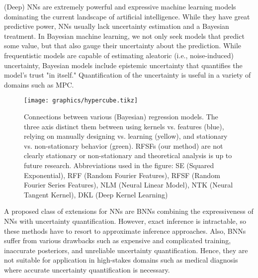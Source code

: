 (Deep) \acp{NN} are extremely powerful and expressive machine learning models dominating the current landscape of artificial intelligence\cite{krizhevskyImageNetClassificationDeep2012}.
While they have great predictive power, \acp{NN} usually lack uncertainty estimation and a Bayesian treatment.
In Bayesian machine learning, we not only seek models that predict some value, but that also gauge their uncertainty about the prediction.
While frequentistic models are capable of estimating aleatoric (i.e., noise-induced) uncertainty, Bayesian models include epistemic uncertainty that quantifies the model's trust "in itself."
Quantification of the uncertainty is useful in a variety of domains such as \ac{MPC}\cite{hewingLearningBasedModelPredictive2020,bradfordStochasticDatadrivenModel2020}.

\begin{figure}
	\centering
	\texttt{[image: graphics/hypercube.tikz]}
	\caption{
		Connections between various (Bayesian) regression models.
		The three axis distinct them between using kernels vs. features (blue), relying on manually designing vs. learning (yellow), and stationary vs. non-stationary behavior (green).
		\acsp{RFSF} (our method) are not clearly stationary or non-stationary and theoretical analysis is up to future research.
		Abbreviations used in the figure: \acs{SE} (Squared Exponential), \acs{RFF} (Random Fourier Features), \acs{RFSF} (Random Fourier Series Features), \acs{NLM} (Neural Linear Model), \acs{NTK} (Neural Tangent Kernel), \acs{DKL} (Deep Kernel Learning)
	}
	\label{fig:hypercube}
\end{figure}

A proposed class of extensions for \acp{NN} are \acp{BNN}\cite{mackayPracticalBayesianFramework1992,nealBayesianLearningNeural2012} combining the expressiveness of \acp{NN} with uncertainty quantification.
However, exact inference is intractable, so these methods have to resort to approximate inference approaches\cite{nealBayesianLearningNeural2012,hernandez-lobatoProbabilisticBackpropagationScalable2015,denkerTransformingNeuralNetOutput1990,galDropoutBayesianApproximation2016,lakshminarayananSimpleScalablePredictive2017,blundellWeightUncertaintyNeural2015}.
Also, \acp{BNN} suffer from various drawbacks such as expensive and complicated training, inaccurate posteriors, and unreliable uncertainty quantification\cite{foongExpressivenessApproximateInference2020,foongInBetweenUncertaintyBayesian2019,osbandRandomizedPriorFunctions2018,ovadiaCanYouTrust2019,wenzelHowGoodBayes2020,yaoQualityUncertaintyQuantification2019}.
Hence, they are not suitable for application in high-stakes domains such as medical diagnosis where accurate uncertainty quantification is necessary\cite{watsonLatentDerivativeBayesian2021}.

